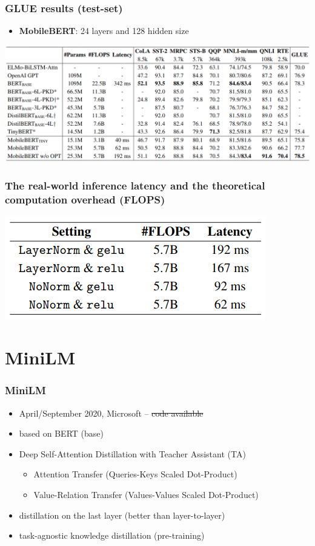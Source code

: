 \documentclass{beamer}
\begin{document}
\begin{frame}
    \frametitle{GLUE results (test-set)}
    \begin{itemize}
      \item \textbf{MobileBERT}: 24 layers and 128 hidden size
    \end{itemize}
    \begin{center}
        \includegraphics[scale=0.3]{img/mobile_bert_glue.png}
    \end{center}
\end{frame}

\begin{frame}
    \frametitle{The real-world inference latency and the theoretical
computation overhead (FLOPS)}
    \begin{center}
        \includegraphics[scale=0.34]{img/mobile_bert_latency.png}
    \end{center}
\end{frame}



\section{MiniLM}
\begin{frame}
    \frametitle{MiniLM \cite{mini_lm}}
    \begin{itemize}
        \item April/September 2020, Microsoft -- \sout{code available}
        \item based on BERT (base)
        \item Deep Self-Attention Distillation with Teacher Assistant (TA)
        \begin{itemize}
          \item Attention Transfer (Queries-Keys Scaled Dot-Product)
          \item Value-Relation Transfer (Values-Values Scaled Dot-Product)
        \end{itemize}
        \item distillation on the last layer (better than layer-to-layer)
        \item task-agnostic knowledge distillation (pre-training)
    \end{itemize}
\end{frame}
\end{document}
